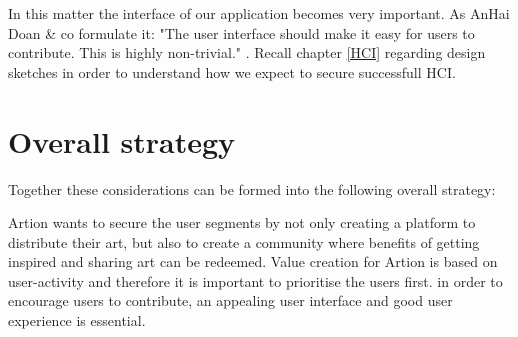 \forceindent In this matter the interface of our application becomes very important. As AnHai Doan \& co formulate it: "The user interface should make it easy for users to contribute. This is highly non-trivial." \cite[95]{Crowdsourcing}. Recall chapter \ref{HCI} regarding design sketches in order to understand how we expect to secure successfull HCI.
\section{Overall strategy}
Together these considerations can be formed into the following overall strategy:

Artion wants to secure the user segments by not only creating a platform to distribute their art, but also to create a community where benefits of getting inspired and sharing art can be redeemed. Value creation for Artion is based on user-activity and therefore it is important to prioritise the users first. in order to encourage users to contribute, an appealing user interface and good user experience is essential. 
